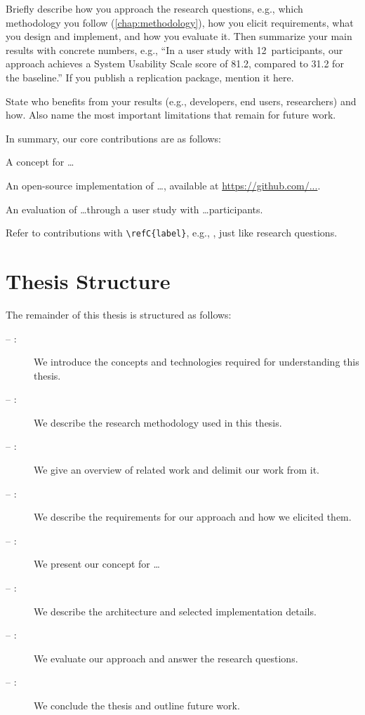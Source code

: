 Briefly describe how you approach the research questions, e.g., which methodology you follow (\cref{chap:methodology}), how you elicit requirements, what you design and implement, and how you evaluate it.
Then summarize your main results with concrete numbers, e.g., \enquote{In a user study with 12~participants, our approach achieves a System Usability Scale score of 81.2, compared to 31.2 for the baseline.}
If you publish a replication package, mention it here.

State who benefits from your results (e.g., developers, end users, researchers) and how.
Also name the most important limitations that remain for future work.

In summary, our core contributions are as follows:
\begin{contributions}
  \item A concept for \ldots\label{c:concept}
  \item An open-source implementation of \ldots, available at \url{https://github.com/...}.\label{c:implementation}
  \item An evaluation of \ldots through a user study with \ldots participants.\label{c:evaluation}
\end{contributions}
Refer to contributions with \verb|\refC{label}|, e.g., , just like research questions.

\section*{Thesis Structure}

The remainder of this thesis is structured as follows:
\begin{description}
  \item[ -- :] We introduce the concepts and technologies required for understanding this thesis.
  \item[ -- :] We describe the research methodology used in this thesis.
  \item[ -- :] We give an overview of related work and delimit our work from it.
  \item[ -- :] We describe the requirements for our approach and how we elicited them.
  \item[ -- :] We present our concept for \ldots
  \item[ -- :] We describe the architecture and selected implementation details.
  \item[ -- :] We evaluate our approach and answer the research questions.
  \item[ -- :] We conclude the thesis and outline future work.
\end{description}

